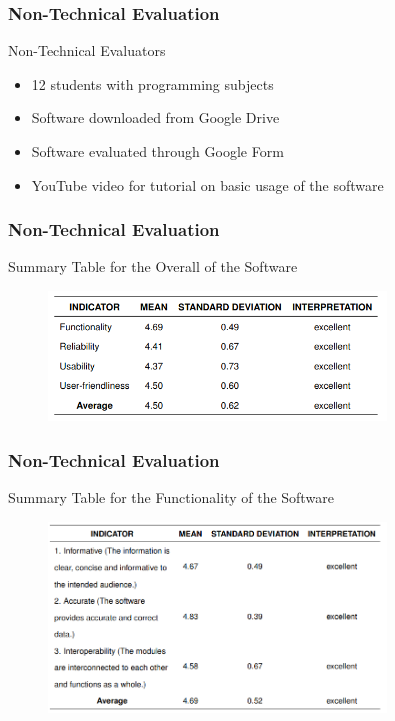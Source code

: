 \documentclass{beamer}
\begin{document}
\begin{frame}
	\frametitle{Non-Technical Evaluation}
	\begin{block}{Non-Technical Evaluators}
		\begin{itemize}
			\item<1-> 12 students with programming subjects
			\item<2-> Software downloaded from Google Drive
			\item<3-> Software evaluated through Google Form
			\item<4-> YouTube video for tutorial on basic usage of the software
		\end{itemize}
	\end{block}
\end{frame}

\begin{frame}
	\frametitle{Non-Technical Evaluation}
	\begin{block}{Summary Table for the Overall of the Software}
		\begin{figure}
			\includegraphics[width=0.8\textwidth]{figures/res_non_tech_overall.png}
		\end{figure}
	\end{block}
\end{frame}

\begin{frame}
	\frametitle{Non-Technical Evaluation}
	\begin{block}{Summary Table for the Functionality of the Software}
		\begin{figure}
			\includegraphics[width=0.8\textwidth]{figures/res_non_tech_functionality.png}
		\end{figure}
	\end{block}
\end{frame}
\end{document}
